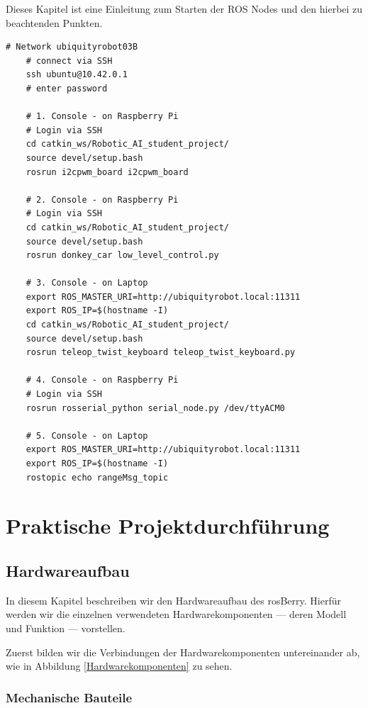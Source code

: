 \documentclass[conference]{IEEEtran}
\begin{document}
Dieses Kapitel ist eine Einleitung zum Starten der ROS Nodes und den hierbei zu beachtenden Punkten.

\begin{lstlisting}[label={list:first},caption=Sample rosBash code.]
	# Network ubiquityrobot03B
	# connect via SSH
	ssh ubuntu@10.42.0.1
	# enter password

	# 1. Console - on Raspberry Pi
	# Login via SSH
	cd catkin_ws/Robotic_AI_student_project/
	source devel/setup.bash
	rosrun i2cpwm_board i2cpwm_board

	# 2. Console - on Raspberry Pi
	# Login via SSH
	cd catkin_ws/Robotic_AI_student_project/
	source devel/setup.bash
	rosrun donkey_car low_level_control.py

	# 3. Console - on Laptop 
	export ROS_MASTER_URI=http://ubiquityrobot.local:11311
	export ROS_IP=$(hostname -I)
	cd catkin_ws/Robotic_AI_student_project/
	source devel/setup.bash
	rosrun teleop_twist_keyboard teleop_twist_keyboard.py

	# 4. Console - on Raspberry Pi
	# Login via SSH
	rosrun rosserial_python serial_node.py /dev/ttyACM0

	# 5. Console - on Laptop
	export ROS_MASTER_URI=http://ubiquityrobot.local:11311
	export ROS_IP=$(hostname -I)
	rostopic echo rangeMsg_topic
\end{lstlisting}

\section{Praktische Projektdurchführung}


\subsection{Hardwareaufbau}%
In diesem Kapitel beschreiben wir den Hardwareaufbau des rosBerry.
Hierfür werden wir die einzelnen verwendeten Hardwarekomponenten — deren Modell und Funktion — vorstellen.

Zuerst bilden wir die Verbindungen der Hardwarekomponenten untereinander ab, wie in Abbildung \ref{Hardwarekomponenten} zu sehen.
\subsubsection{Mechanische Bauteile}
\end{document}
